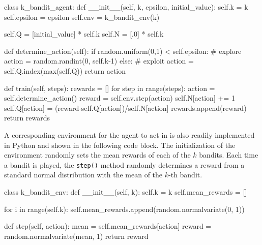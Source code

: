 \begin{samepage}
\begin{pythoncode}
class k_bandit_agent:
    def __init__(self, k, epsilon, initial_value):
        self.k = k
        self.epsilon = epsilon
        self.env = k_bandit_env(k)

        self.Q = [initial_value] * self.k
        self.N = [.0] * self.k

    def determine_action(self):
        if random.uniform(0,1) < self.epsilon:
            # explore
            action = random.randint(0, self.k-1)
        else:
            # exploit
            action = self.Q.index(max(self.Q))
        return action

    def train(self, steps):
        rewards = []
        for step in range(steps):
            action = self.determine_action()
            reward = self.env.step(action)
            self.N[action] += 1
            self.Q[action] = (reward-self.Q[action])/self.N[action]
            rewards.append(reward)
        return rewards
\end{pythoncode}
\end{samepage}

A corresponding environment for the agent to act in is also readily implemented in Python and shown in the following code block. The initialization of the environment randomly sets the mean rewards of each of the $k$ bandits. Each time a bandit is played, the \texttt{step()} method randomly determines a reward from a standard normal distribution with the mean of the $k$-th bandit.

\begin{samepage}
\begin{pythoncode}
class k_bandit_env:
    def __init__(self, k):
        self.k = k
        self.mean_rewards = []

        for i in range(self.k):
            self.mean_rewards.append(random.normalvariate(0, 1))

    def step(self, action):
        mean = self.mean_rewards[action]
        reward = random.normalvariate(mean, 1)
        return reward
\end{pythoncode}
\end{samepage}

